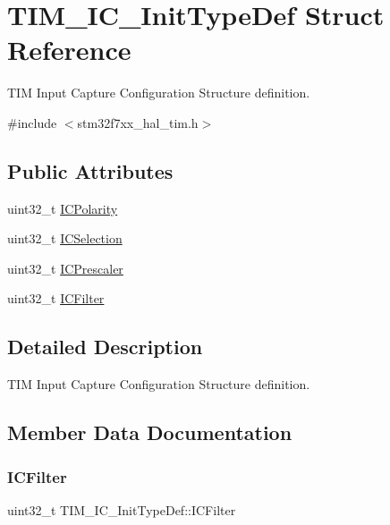 \hypertarget{struct_t_i_m___i_c___init_type_def}{}\section{T\+I\+M\+\_\+\+I\+C\+\_\+\+Init\+Type\+Def Struct Reference}
\label{struct_t_i_m___i_c___init_type_def}


T\+IM Input Capture Configuration Structure definition.  




{\ttfamily \#include $<$stm32f7xx\+\_\+hal\+\_\+tim.\+h$>$}

\subsection*{Public Attributes}
\begin{DoxyCompactItemize}
\item 
uint32\+\_\+t \mbox{\hyperlink{struct_t_i_m___i_c___init_type_def_ab122383ebc0926c49a814546471da9b3}{I\+C\+Polarity}}
\item 
uint32\+\_\+t \mbox{\hyperlink{struct_t_i_m___i_c___init_type_def_aad80556490de79727ba1269c851e9724}{I\+C\+Selection}}
\item 
uint32\+\_\+t \mbox{\hyperlink{struct_t_i_m___i_c___init_type_def_a452a4a459b6f7b7c478db032de9b0d72}{I\+C\+Prescaler}}
\item 
uint32\+\_\+t \mbox{\hyperlink{struct_t_i_m___i_c___init_type_def_ae8432aa11b5495b252ac7ae299eabb32}{I\+C\+Filter}}
\end{DoxyCompactItemize}


\subsection{Detailed Description}
T\+IM Input Capture Configuration Structure definition. 

\subsection{Member Data Documentation}
\mbox{\label{struct_t_i_m___i_c___init_type_def_ae8432aa11b5495b252ac7ae299eabb32}} 
\subsubsection{\texorpdfstring{ICFilter}{ICFilter}}
{\footnotesize\ttfamily uint32\+\_\+t T\+I\+M\+\_\+\+I\+C\+\_\+\+Init\+Type\+Def\+::\+I\+C\+Filter}

